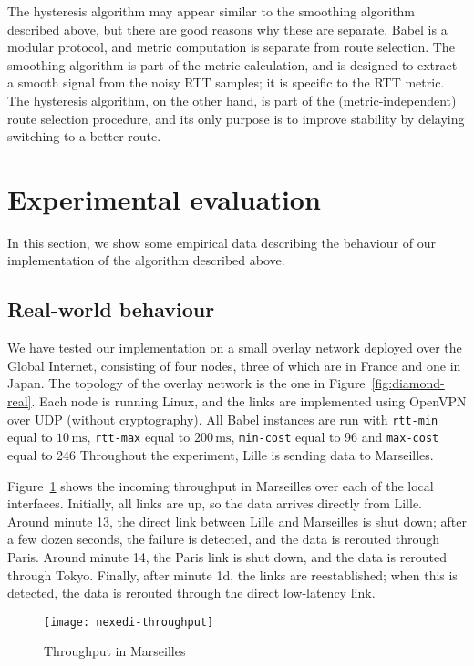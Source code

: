 \documentclass[conference,letterpaper]{IEEEtran}
\begin{document}
The hysteresis algorithm may appear similar to the smoothing algorithm
described above, but there are good reasons why these are separate.
Babel is a modular protocol, and metric computation is separate from
route selection.  The smoothing algorithm is part of the metric
calculation, and is designed to extract a smooth signal from the noisy
RTT samples; it is specific to the RTT metric.  The hysteresis
algorithm, on the other hand, is part of the (metric-independent)
route selection procedure, and its only purpose is to improve
stability by delaying switching to a better route.

\section{Experimental evaluation}

In this section, we show some empirical data describing the behaviour
of our implementation of the algorithm described above.

\subsection{Real-world behaviour}

We have tested our implementation on a small overlay network deployed
over the Global Internet, consisting of four nodes, three of which are
in France and one in Japan.  The topology of the overlay network is
the one in Figure~\ref{fig:diamond-real}.  Each node is running Linux,
and the links are implemented using OpenVPN over UDP (without
cryptography).  All Babel instances are run with \verb|rtt-min| equal
to $10\,\textrm{ms}$, \verb|rtt-max| equal to $200\,\textrm{ms}$,
\verb|min-cost| equal to 96 and \verb|max-cost| equal to 246
Throughout the experiment, Lille is sending data to Marseilles.

Figure~\ref{fig:nexedi-throughput} shows the incoming throughput in
Marseilles over each of the local interfaces.  Initially, all links
are up, so the data arrives directly from Lille.  Around minute 13,
the direct link between Lille and Marseilles is shut down; after a few
dozen seconds, the failure is detected, and the data is rerouted
through Paris.  Around minute 14, the Paris link is shut down, and the
data is rerouted through Tokyo.  Finally, after minute 1d, the links
are reestablished; when this is detected, the data is rerouted through
the direct low-latency link.

\begin{figure}[htb]
\centering
\texttt{[image: nexedi-throughput]}
\caption{Throughput in Marseilles}
\label{fig:nexedi-throughput}
\end{figure}
\end{document}
